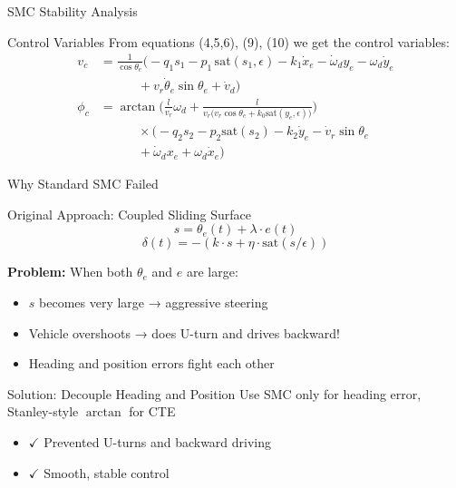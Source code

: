 \documentclass[10pt]{beamer}
\begin{document}
\begin{frame}{SMC Stability Analysis}
  \begin{block}{Control Variables}
    From equations (4,5,6), (9), (10) we get the control variables:
\begin{align*}
v_c &= \frac{1}{\cos\theta_e}\Big(
      - q_1 s_1 - p_1 \,\text{sat}(s_1,\epsilon) - k_1 \dot{x}_e
      - \dot{\omega}_d y_e - \omega_d \dot{y}_e  \\
    &\qquad\quad
      + v_r \dot{\theta}_e \sin\theta_e + \dot{v}_d
      \Big) \\[1ex]
\phi_c &= \arctan\Bigg(
        \frac{l}{v_r}\omega_d
        + \frac{l}{v_r\big(v_r\cos\theta_e + k_0 \text{sat}(y_e,\epsilon)\big)}
        \Bigg) \\
    &\qquad\quad \times \Big(
        - q_2 s_2 - p_2 \text{sat}(s_2)
        - k_2 \dot{y}_e - \dot{v}_r \sin\theta_e  \\
    &\qquad\quad
        + \dot{\omega}_d x_e + \omega_d \dot{x}_e
        \Big)
\end{align*}

  \end{block}
\end{frame}

\begin{frame}{Why Standard SMC Failed}
  \begin{alertblock}{Original Approach: Coupled Sliding Surface}
    $$s = \theta_e(t) + \lambda \cdot e(t)$$
    $$\delta(t) = -(k \cdot s + \eta \cdot \text{sat}(s/\epsilon))$$
  \end{alertblock}

  \textbf{Problem:} When both $\theta_e$ and $e$ are large:
  \begin{itemize}
    \item $s$ becomes very large → aggressive steering
    \item Vehicle overshoots → does U-turn and drives backward!
    \item Heading and position errors fight each other
  \end{itemize}

  \vspace{0.3cm}

  \begin{block}{Solution: Decouple Heading and Position}
    Use SMC only for heading error, Stanley-style $\arctan$ for CTE
    \begin{itemize}
      \item $\checkmark$ Prevented U-turns and backward driving
      \item $\checkmark$ Smooth, stable control
    \end{itemize}
  \end{block}
\end{frame}
\end{document}
